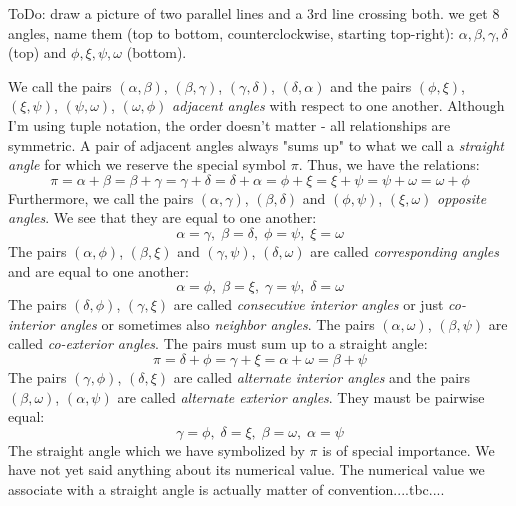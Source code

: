 \medskip
ToDo: draw a picture of two parallel lines and a 3rd line crossing both. we get 8 angles, name them (top to bottom, counterclockwise, starting top-right): $\alpha, \beta, \gamma, \delta$ (top) and $\phi, \xi, \psi, \omega$ (bottom). 

\medskip
We call the pairs $(\alpha, \beta)$, $(\beta, \gamma)$, $(\gamma, \delta)$, $(\delta, \alpha)$ and the pairs $(\phi, \xi)$, $(\xi, \psi)$, $(\psi, \omega)$, $(\omega, \phi)$ \emph{adjacent angles} with respect to one another. Although I'm using tuple notation, the order doesn't matter - all relationships are symmetric. A pair of adjacent angles always "sums up" to what we call a \emph{straight angle} for which we reserve the special symbol $\pi$. Thus, we have the relations:
\begin{equation}
  \pi = \alpha + \beta = \beta + \gamma = \gamma + \delta = \delta + \alpha 
      = \phi + \xi = \xi + \psi = \psi + \omega = \omega + \phi
\end{equation}
Furthermore, we call the pairs $(\alpha, \gamma)$, $(\beta, \delta)$ and $(\phi, \psi)$, $(\xi, \omega)$ \emph{opposite angles}. We see that they are equal to one another:
\begin{equation}
  \alpha = \gamma, \; \beta = \delta, \; \phi = \psi, \; \xi = \omega
\end{equation}
The pairs $(\alpha, \phi)$, $(\beta, \xi)$ and  $(\gamma, \psi)$, $(\delta, \omega)$ are called \emph{corresponding angles} and are equal to one another:
\begin{equation}
  \alpha = \phi, \; \beta = \xi, \; \gamma = \psi, \; \delta = \omega
\end{equation}
The pairs $(\delta, \phi)$, $(\gamma, \xi)$ are called \emph{consecutive interior angles} or just \emph{co-interior angles} or sometimes also \emph{neighbor angles}. The pairs  $(\alpha, \omega)$, $(\beta, \psi)$ are called \emph{co-exterior angles}. The pairs must sum up to a straight angle:
\begin{equation}
  \pi = \delta + \phi = \gamma + \xi = \alpha + \omega = \beta + \psi
\end{equation}
The pairs $(\gamma, \phi)$, $(\delta, \xi)$ are called \emph{alternate interior angles} and the pairs $(\beta, \omega)$, $(\alpha, \psi)$ are called \emph{alternate exterior angles}. They maust be pairwise equal:
\begin{equation}
  \gamma = \phi, \; \delta = \xi, \; \beta = \omega, \; \alpha = \psi
\end{equation}
The straight angle which we have symbolized by $\pi$ is of special importance. We have not yet said anything about its numerical value. The numerical value we associate with a straight angle is actually matter of convention....tbc....


